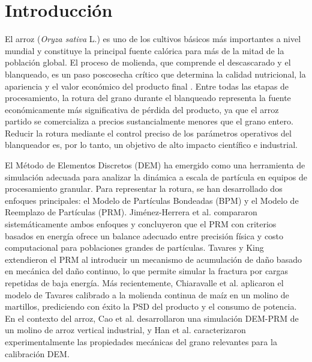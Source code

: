 \documentclass[conference]{IEEEtran}
\begin{document}
\section{Introducción}

El arroz (\textit{Oryza sativa} L.) es uno de los cultivos básicos más importantes a nivel mundial y constituye la principal fuente calórica para más de la mitad de la población global. El proceso de molienda, que comprende el descascarado y el blanqueado, es un paso poscosecha crítico que determina la calidad nutricional, la apariencia y el valor económico del producto final \cite{afzalinia2002}. Entre todas las etapas de procesamiento, la rotura del grano durante el blanqueado representa la fuente económicamente más significativa de pérdida del producto, ya que el arroz partido se comercializa a precios sustancialmente menores que el grano entero. Reducir la rotura mediante el control preciso de los parámetros operativos del blanqueador es, por lo tanto, un objetivo de alto impacto científico e industrial.

El Método de Elementos Discretos (DEM) ha emergido como una herramienta de simulación adecuada para analizar la dinámica a escala de partícula en equipos de procesamiento granular. Para representar la rotura, se han desarrollado dos enfoques principales: el Modelo de Partículas Bondeadas (BPM) y el Modelo de Reemplazo de Partículas (PRM). Jiménez-Herrera et al. \cite{jimenez2018} compararon sistemáticamente ambos enfoques y concluyeron que el PRM con criterios basados en energía ofrece un balance adecuado entre precisión física y costo computacional para poblaciones grandes de partículas. Tavares y King \cite{tavares1998} extendieron el PRM al introducir un mecanismo de acumulación de daño basado en mecánica del daño continuo, lo que permite simular la fractura por cargas repetidas de baja energía. Más recientemente, Chiaravalle et al. \cite{chiaravalle2025} aplicaron el modelo de Tavares calibrado a la molienda continua de maíz en un molino de martillos, prediciendo con éxito la PSD del producto y el consumo de potencia. En el contexto del arroz, Cao et al. \cite{cao2022} desarrollaron una simulación DEM-PRM de un molino de arroz vertical industrial, y Han et al. \cite{han2021} caracterizaron experimentalmente las propiedades mecánicas del grano relevantes para la calibración DEM.
\end{document}
